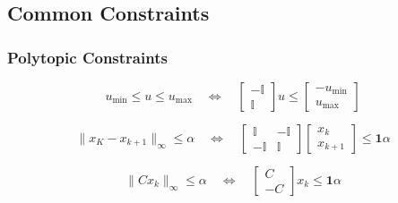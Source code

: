 \subsection{Common Constraints}
\subsubsection{Polytopic Constraints}
\begin{equation*}
    u_{\min} \leq u \leq u_{\max} \quad \Leftrightarrow \quad \begin{bmatrix}
        -\mathbb{I} \\
        \mathbb{I}
    \end{bmatrix} u \leq \begin{bmatrix}
        -u_{\min} \\
        u_{\max}
    \end{bmatrix}
\end{equation*}

\newpar{}
\begin{equation*}
    \|x_K - x_{k+1}\|_\infty \leq \alpha \quad \Leftrightarrow \quad \begin{bmatrix}
        \mathbb{I}  & -\mathbb{I} \\
        -\mathbb{I} & \mathbb{I}
    \end{bmatrix}\begin{bmatrix}
        x_k \\
        x_{k+1}
    \end{bmatrix} \leq \bm{1} \alpha
\end{equation*}

\newpar{}

\begin{equation*}
    \|C x_k\|_\infty \leq \alpha \quad \Leftrightarrow \quad \begin{bmatrix}
        C \\ -C
    \end{bmatrix} x_k \leq \bm{1} \alpha
\end{equation*}
